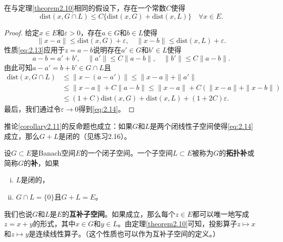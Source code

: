 \begin{corollary}\label{corollary2.11}
在与定理\ref{theorem2.10}相同的假设下，存在一个常数$C$使得
\begin{equation}
\text{dist}(x, G \cap L) \leq C\{\text{dist}(x,G) + \text{dist}(x,L)\} \quad \forall x \in E. \label{eq:2.14}
\end{equation}
\end{corollary}

\begin{proof}
给定$x \in E$和$\varepsilon > 0$，存在$a \in G$和$b \in L$使得
\[
\|x-a\| \leq \text{dist}(x,G) + \varepsilon, \quad \|x-b\| \leq \text{dist}(x,L) + \varepsilon.
\]
性质\eqref{eq:2.13}应用于$z=a-b$说明存在$a' \in G$和$b' \in L$使得
\[
a-b = a' + b', \quad \|a'\| \leq C\|a-b\|, \quad \|b'\| \leq C\|a-b\|.
\]
由此可知$a-a' = b+b' \in G \cap L$且
\begin{align*}
\text{dist}(x, G \cap L) &\leq \|x-(a-a')\| \leq \|x-a\| + \|a'\| \\
&\leq \|x-a\| + C\|a-b\| \leq \|x-a\| + C(\|x-a\| + \|x-b\|) \\
&\leq (1+C)\text{dist}(x,G) + \text{dist}(x,L) + (1+2C)\varepsilon.
\end{align*}
最后，我们通过令$\varepsilon \to 0$得到\eqref{eq:2.14}。
\end{proof}

\begin{remark}
推论\ref{corollary2.11}的反命题也成立：如果$G$和$L$是两个闭线性子空间使得\eqref{eq:2.14}成立，那么$G+L$是闭的（见练习2.16）。
\end{remark}

\begin{definition}
设$G \subset E$是Banach空间$E$的一个闭子空间。一个子空间$L \subset E$被称为$G$的\textbf{拓扑补}或简称$G$的\textbf{补}，如果
\begin{enumerate}[(i)]
    \item $L$是闭的，
    \item $G \cap L = \{0\}$且$G+L=E$。
\end{enumerate}
我们也说$G$和$L$是$E$的\textbf{互补子空间}。如果成立，那么每个$z \in E$都可以唯一地写成$z=x+y$的形式，其中$x \in G$和$y \in L$。由定理\ref{theorem2.10}可知，投影算子$z \mapsto x$和$z \mapsto y$是连续线性算子。（这个性质也可以作为互补子空间的定义。）
\end{definition}

